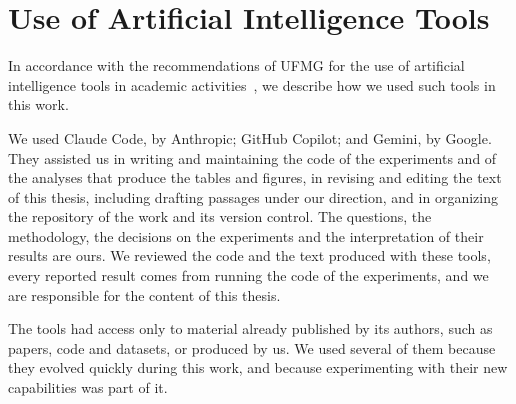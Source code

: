 \chapter{Use of Artificial Intelligence Tools}
\label{app:ai_use}

In accordance with the recommendations of UFMG for the use of artificial intelligence tools in academic activities~\cite{ufmg2024ia}, we describe how we used such tools in this work.

We used Claude Code, by Anthropic; GitHub Copilot; and Gemini, by Google. They assisted us in writing and maintaining the code of the experiments and of the analyses that produce the tables and figures, in revising and editing the text of this thesis, including drafting passages under our direction, and in organizing the repository of the work and its version control. The questions, the methodology, the decisions on the experiments and the interpretation of their results are ours. We reviewed the code and the text produced with these tools, every reported result comes from running the code of the experiments, and we are responsible for the content of this thesis.

The tools had access only to material already published by its authors, such as papers, code and datasets, or produced by us. We used several of them because they evolved quickly during this work, and because experimenting with their new capabilities was part of it.
